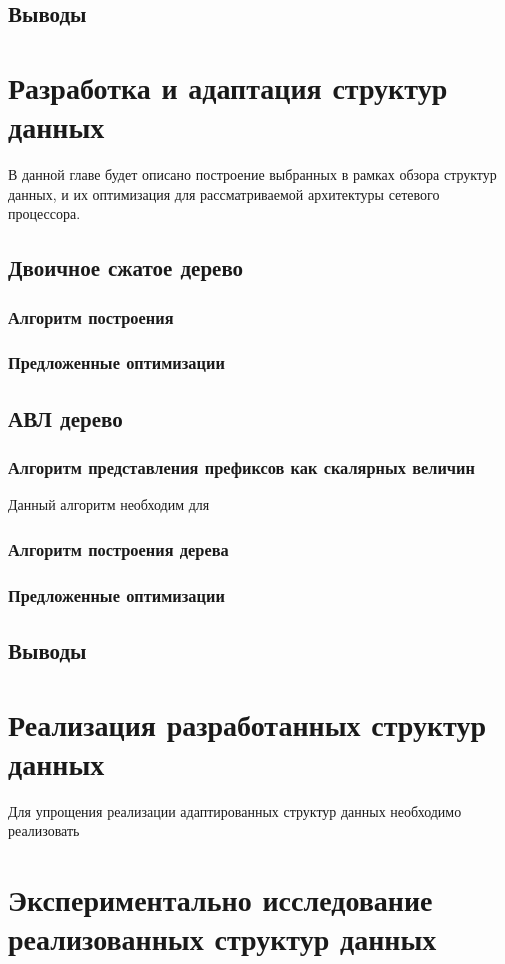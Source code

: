 \documentclass[a4paper, 12pt, titlepage, finall]{extreport}
\begin{document}
        \section{Выводы}
   \chapter{Разработка и адаптация структур данных}
        В данной главе будет описано построение выбранных в рамках обзора структур данных, и их оптимизация для рассматриваемой архитектуры сетевого процессора. 
        \section{Двоичное сжатое дерево}
            \subsection{Алгоритм построения}
            \subsection{Предложенные оптимизации}
        \section{АВЛ дерево}
            \subsection{Алгоритм представления префиксов как скалярных величин}
                Данный алгоритм необходим для
            \subsection{Алгоритм построения дерева}
            \subsection{Предложенные оптимизации}
        \section{Выводы}
    \chapter{Реализация разработанных структур данных}
        Для упрощения реализации адаптированных структур данных необходимо реализовать
    \chapter{Экспериментально исследование реализованных структур данных}
\end{document}
